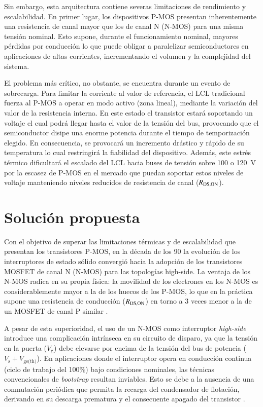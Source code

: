 \documentclass[12pt]{report} %
\begin{document}
Sin embargo, esta arquitectura contiene severas limitaciones de rendimiento y escalabilidad. En primer lugar, los dispositivos P-MOS presentan inherentemente una resistencia de canal mayor que los de canal N (N-MOS) para una misma tensión nominal. Esto supone, durante el funcionamiento nominal, mayores pérdidas por conducción lo que puede obligar a paralelizar semiconductores en aplicaciones de altas corrientes, incrementando el volumen y la complejidad del sistema.

El problema más crítico, no obstante, se encuentra durante un evento de sobrecarga. Para limitar la corriente al valor de referencia, el LCL tradicional fuerza al P-MOS a operar en modo activo (zona lineal), mediante la variación del valor de la resistencia interna. En este estado el transistor estará soportando un voltaje el cual podrá llegar hasta el valor de la tensión del bus, provocando que el semiconductor disipe una enorme potencia durante el tiempo de temporización elegido.
En consecuencia, se provocará un incremento drástico y rápido de su temperatura lo cual restringirá la fiabilidad del dispositivo. Además, este estrés térmico dificultará el escalado del LCL hacia buses de tensión sobre 100 o 120~V por la escasez de P-MOS en el mercado que puedan soportar estos niveles de voltaje manteniendo niveles reducidos de resistencia de canal ($R_{\text{DS,ON}}$).

\section{Solución propuesta}
Con el objetivo de superar las limitaciones térmicas y de escalabilidad que presentan los transistores P-MOS, en la década de los 90 la evolución de los interruptores de estado sólido convergió hacia la adopción de los transistores MOSFET de canal N (N-MOS) para las topologías high-side. 
La ventaja de los N-MOS radica en su propia física: la movilidad de los electrones en los N-MOS es considerablemente mayor a la de los huecos de los P-MOS, lo que en la práctica supone una resistencia de conducción ($R_{\text{DS,ON}}$) en torno a 3 veces menor a la de un MOSFET de canal P similar \cite{tim_skovmand_micropower_1993}.

A pesar de esta superioridad, el uso de un N-MOS como interruptor \textit{high-side} introduce una complicación intrínseca en su circuito de disparo, ya que la tensión en la puerta ($V_\text{g}$) debe elevarse por encima de la tensión del bus de potencia ($V_\text{s} + V_\text{gs(th)}$). En aplicaciones donde el interruptor opera en conducción continua (ciclo de trabajo del 100\%) bajo condiciones nominales, las técnicas convencionales de \textit{bootstrap} resultan inviables. Esto se debe a la ausencia de una conmutación periódica que permita la recarga del condensador de flotación, derivando en su descarga prematura y el consecuente apagado del transistor \cite{tim_skovmand_micropower_1993}.
\end{document}
